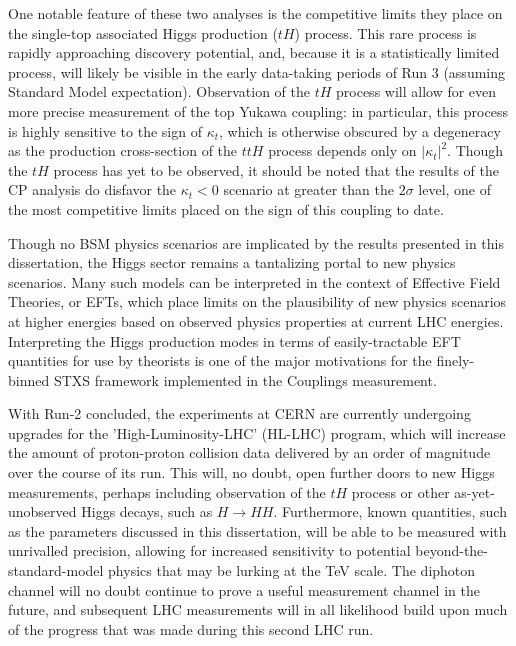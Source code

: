 One notable feature of these two analyses is the competitive limits they place on the single-top associated Higgs production ($tH$) process. This rare process is rapidly approaching discovery potential, and, because it is a statistically limited process, will likely be visible in the early data-taking periods of Run 3 (assuming Standard Model expectation). Observation of the $tH$ process will allow for even more precise measurement of the top Yukawa coupling: in particular, this process is highly sensitive to the sign of $\kappa_{t}$, which is otherwise obscured by a degeneracy as the production cross-section of the $ttH$ process depends only on $|\kappa_{t}|^{2}$. Though the $tH$ process has yet to be observed, it should be noted that the results of the CP analysis do disfavor the $\kappa_{t} < 0$ scenario at greater than the $2 \sigma$ level, one of the most competitive limits placed on the sign of this coupling to date.

Though no BSM physics scenarios are implicated by the results presented in this dissertation, the Higgs sector remains a tantalizing portal to new physics scenarios. Many such models can be interpreted in the context of Effective Field Theories, or EFTs, which place limits on the plausibility of new physics scenarios at higher energies based on observed physics properties at current LHC energies. Interpreting the Higgs production modes in terms of easily-tractable EFT quantities for use by theorists is one of the major motivations for the finely-binned STXS framework implemented in the Couplings measurement.

With Run-2 concluded, the experiments at CERN are currently undergoing upgrades for the 'High-Luminosity-LHC' (HL-LHC) program, which will increase the amount of proton-proton collision data delivered by an order of magnitude over the course of its run. This will, no doubt, open further doors to new Higgs measurements, perhaps including observation of the $tH$ process or other as-yet-unobserved Higgs decays, such as $H \rightarrow HH$. Furthermore, known quantities, such as the parameters discussed in this dissertation, will be able to be measured with unrivalled precision, allowing for increased sensitivity to potential beyond-the-standard-model physics that may be lurking at the TeV scale. The diphoton channel will no doubt continue to prove a useful measurement channel in the future, and subsequent LHC measurements will in all likelihood build upon much of the progress that was made during this second LHC run.
